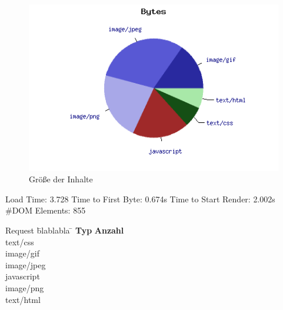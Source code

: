 \begin{figure}[htbp]
  \centering
  \includegraphics[scale=0.5]{material/start_byte_pie.png}
  \caption{Größe der Inhalte}
  \label{fig:startbyte}
\end{figure}

Load Time: 3.728
Time to First Byte: 0.674s 	
Time to Start Render: 2.002s
\#DOM Elements: 855 	

\begin{tabbing}
Request \quad\= blablabla \quad\= \kill
\textbf{Typ} 	 \> \textbf{Anzahl} \\
text/css	  	\\
image/gif	  	\\
image/jpeg	  	\\
javascript	  	\\ 
image/png	  	\\
text/html	  	\\
\end{tabbing}


